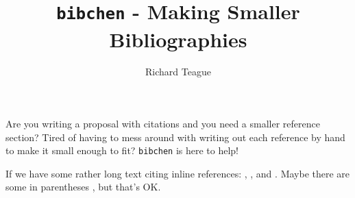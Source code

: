 \documentclass[12pt]{article}
\title{\texttt{bibchen} - Making Smaller Bibliographies}
\author{Richard Teague}
\begin{document}
\maketitle{}

Are you writing a proposal with citations and you need a smaller reference
section? Tired of having to mess around with writing out each reference by hand
to make it small enough to fit? \texttt{bibchen} is here to help!

If we have some rather long text citing inline references:
\citet{Teague_ea_2018}, \citet{Teague_Foreman-Mackey_2018}, and
\citet{Teague_ea_2017}. Maybe there are some in parentheses
\citep{Teague_ea_2015, Teague_ea_2016}, but that's OK.


{}
\end{document}
